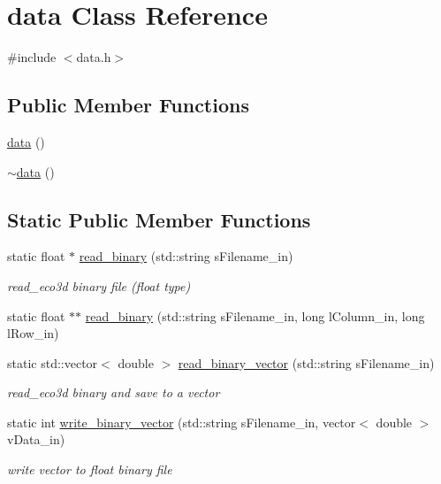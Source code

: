 \hypertarget{classdata}{\section{data Class Reference}
\label{classdata}
}


{\ttfamily \#include $<$data.\-h$>$}

\subsection*{Public Member Functions}
\begin{DoxyCompactItemize}
\item 
\hyperlink{classdata_aad3355ddfb4e1a1212328b01ac441766}{data} ()
\item 
\hyperlink{classdata_ac18b8a36d33f78bb65d09b885657427d}{$\sim$data} ()
\end{DoxyCompactItemize}
\subsection*{Static Public Member Functions}
\begin{DoxyCompactItemize}
\item 
static float $\ast$ \hyperlink{classdata_abc1fde825e15f4ff7b378adffd38327d}{read\-\_\-binary} (std\-::string s\-Filename\-\_\-in)
\begin{DoxyCompactList}\small\item\em read\-\_\-eco3d binary file (float type) \end{DoxyCompactList}\item 
static float $\ast$$\ast$ \hyperlink{classdata_a77b437ef4f21eb6017cc055c701a8c9a}{read\-\_\-binary} (std\-::string s\-Filename\-\_\-in, long l\-Column\-\_\-in, long l\-Row\-\_\-in)
\item 
static std\-::vector$<$ double $>$ \hyperlink{classdata_a234bb6b6f92a4b1de4e17290053fe10f}{read\-\_\-binary\-\_\-vector} (std\-::string s\-Filename\-\_\-in)
\begin{DoxyCompactList}\small\item\em read\-\_\-eco3d binary and save to a vector \end{DoxyCompactList}\item 
static int \hyperlink{classdata_a29e59f19f32c1a41a049d9e1521bae30}{write\-\_\-binary\-\_\-vector} (std\-::string s\-Filename\-\_\-in, vector$<$ double $>$ v\-Data\-\_\-in)
\begin{DoxyCompactList}\small\item\em write vector to float binary file \end{DoxyCompactList}\end{DoxyCompactItemize}


